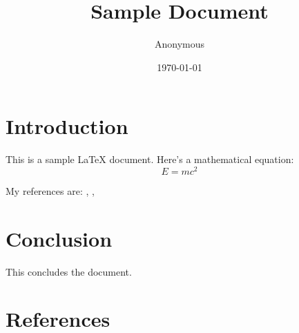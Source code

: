 \documentclass{article}
\title{Sample Document}
\author{Anonymous}
\date{\today}
\begin{document}
\maketitle

\section{Introduction}
This is a sample LaTeX document. Here's a mathematical equation:
\[
E = mc^2
\]

My references are: \cite{wombat2016}, \cite{lion2010}, \cite{wikibook} 

\section{Conclusion}
This concludes the document.

\section{References}


\end{document}
